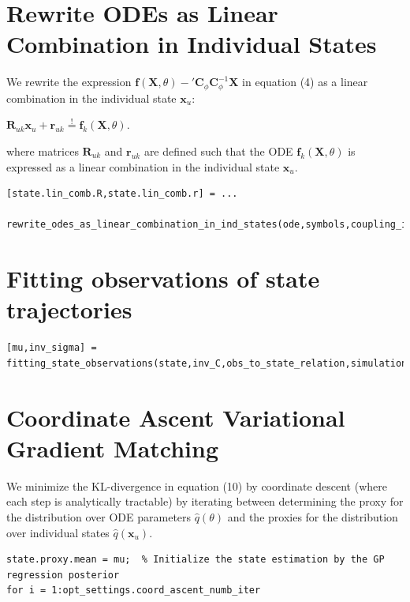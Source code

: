 \section{Rewrite ODEs as Linear Combination in Individual States}

\begin{par}
We rewrite the expression $\mathbf{f}(\mathbf{X},\theta) - {'\mathbf{C}}_{\phi} \mathbf{C}_{\phi}^{-1} \mathbf{X}$ in equation (4) as a linear combination in the individual state $\mathbf{x}_u$:
\end{par} \vspace{1em}
\begin{par}
$\mathbf{R}_{uk} \mathbf{x}_u + \mathbf{r}_{uk} \stackrel{!}{=} \mathbf{f}_k(\mathbf{X},\theta)$.
\end{par} \vspace{1em}
\begin{par}
where matrices $\mathbf{R}_{uk}$ and $\mathbf{r}_{uk}$ are defined such that the ODE $\mathbf{f}_k(\mathbf{X},\theta)$ is expressed as a linear combination in the individual state $\mathbf{x}_u$.
\end{par} \vspace{1em}
\color{RoyalPurple}\begin{verbatim}
[state.lin_comb.R,state.lin_comb.r] = ...
    rewrite_odes_as_linear_combination_in_ind_states(ode,symbols,coupling_idx.states);
\end{verbatim}
\color{black}

\section{Fitting observations of state trajectories}

\begin{par}
\color{RoyalPurple}\begin{verbatim}
[mu,inv_sigma] = fitting_state_observations(state,inv_C,obs_to_state_relation,simulation);
\end{verbatim}
\color{black}
\end{par}

\section{Coordinate Ascent Variational Gradient Matching}

\begin{par}
We minimize the KL-divergence in equation (10) by coordinate descent (where each step is analytically tractable) by iterating between determining the proxy for the distribution over ODE parameters $\hat{q}(\theta)$ and the proxies for the distribution over individual states $\hat{q}(\mathbf{x}_u)$.
\end{par} \vspace{1em}
\color{RoyalPurple}\begin{verbatim}
state.proxy.mean = mu;  % Initialize the state estimation by the GP regression posterior
for i = 1:opt_settings.coord_ascent_numb_iter
\end{verbatim}
\color{black}

